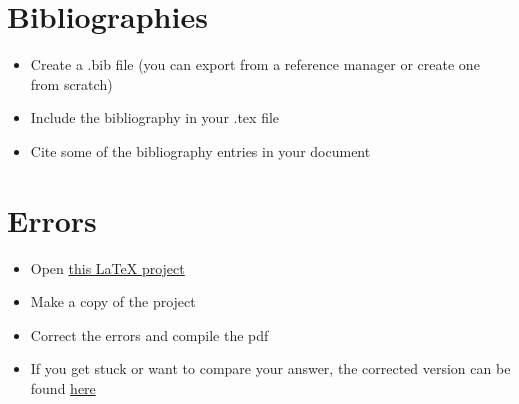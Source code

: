 \documentclass[11pt,a4paper]{article}
\begin{document}
\section{Bibliographies}
\begin{itemize}
\item Create a .bib file (you can export from a reference manager or create one from scratch)
\item Include the bibliography in your .tex file
\item Cite some of the bibliography entries in your document
\end{itemize}

\section{Errors}\label{sec:errors}
\begin{itemize}
\item Open \href{https://www.overleaf.com/read/gnzphcnqgfvf}{this LaTeX project}
\item Make a copy of the project
\item Correct the errors and compile the pdf
\item If you get stuck or want to compare your answer, the corrected version can be found \href{https://www.overleaf.com/read/zsmyvxvdcvfr}{here}
\end{itemize}
\end{document}
